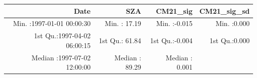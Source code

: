 \documentclass[
  10pt,
  a4paper,oneside]{article}
\begin{document}
\begin{longtable}[]{@{}rrrr@{}}
\toprule
\begin{minipage}[b]{0.33\columnwidth}\raggedleft
Date\strut
\end{minipage} & \begin{minipage}[b]{0.19\columnwidth}\raggedleft
SZA\strut
\end{minipage} & \begin{minipage}[b]{0.19\columnwidth}\raggedleft
CM21\_sig\strut
\end{minipage} & \begin{minipage}[b]{0.19\columnwidth}\raggedleft
CM21\_sig\_sd\strut
\end{minipage}\tabularnewline
\midrule
\endhead
\begin{minipage}[t]{0.33\columnwidth}\raggedleft
Min. :1997-01-01 00:00:30\strut
\end{minipage} & \begin{minipage}[t]{0.19\columnwidth}\raggedleft
Min. : 17.19\strut
\end{minipage} & \begin{minipage}[t]{0.19\columnwidth}\raggedleft
Min. :-0.015\strut
\end{minipage} & \begin{minipage}[t]{0.19\columnwidth}\raggedleft
Min. :0.000\strut
\end{minipage}\tabularnewline
\begin{minipage}[t]{0.33\columnwidth}\raggedleft
1st Qu.:1997-04-02 06:00:15\strut
\end{minipage} & \begin{minipage}[t]{0.19\columnwidth}\raggedleft
1st Qu.: 61.84\strut
\end{minipage} & \begin{minipage}[t]{0.19\columnwidth}\raggedleft
1st Qu.:-0.004\strut
\end{minipage} & \begin{minipage}[t]{0.19\columnwidth}\raggedleft
1st Qu.:0.000\strut
\end{minipage}\tabularnewline
\begin{minipage}[t]{0.33\columnwidth}\raggedleft
Median :1997-07-02 12:00:00\strut
\end{minipage} & \begin{minipage}[t]{0.19\columnwidth}\raggedleft
Median : 89.29\strut
\end{minipage} & \begin{minipage}[t]{0.19\columnwidth}\raggedleft
Median : 0.001\strut
\end{minipage} & \begin{minipage}[t]{0.19\columnwidth}\raggedleft

\end{minipage}
\end{longtable}
\end{document}
